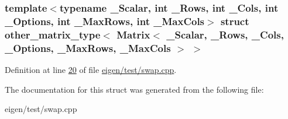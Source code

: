 \subsubsection*{template$<$typename \+\_\+\+Scalar, int \+\_\+\+Rows, int \+\_\+\+Cols, int \+\_\+\+Options, int \+\_\+\+Max\+Rows, int \+\_\+\+Max\+Cols$>$\newline
struct other\+\_\+matrix\+\_\+type$<$ Matrix$<$ \+\_\+\+Scalar, \+\_\+\+Rows, \+\_\+\+Cols, \+\_\+\+Options, \+\_\+\+Max\+Rows, \+\_\+\+Max\+Cols $>$ $>$}



Definition at line \hyperlink{eigen_2test_2swap_8cpp_source_l00020}{20} of file \hyperlink{eigen_2test_2swap_8cpp_source}{eigen/test/swap.\+cpp}.



The documentation for this struct was generated from the following file\+:\begin{DoxyCompactItemize}
\item 
eigen/test/swap.\+cpp\end{DoxyCompactItemize}
